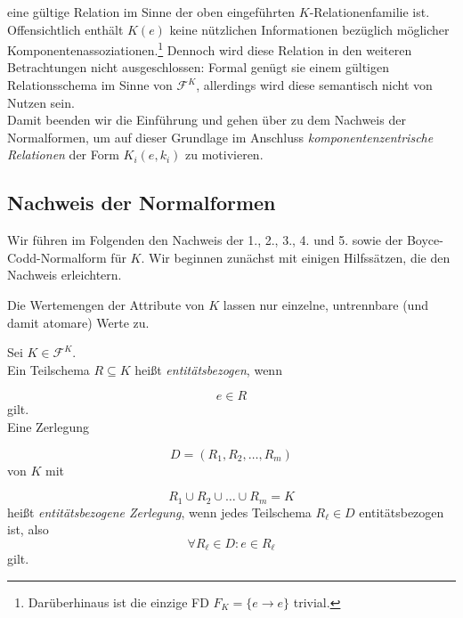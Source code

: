 \noindent
eine gültige Relation im Sinne der oben eingeführten $K$-Relationenfamilie ist.
Offensichtlich enthält $K(e)$ keine nützlichen Informationen bezüglich möglicher Komponentenassoziationen.\footnote{
    Darüberhinaus ist die einzige FD $F_K = \{e \rightarrow e\}$ trivial.
}
Dennoch wird diese Relation in den weiteren Betrachtungen nicht ausgeschlossen:
Formal genügt sie einem gültigen Relationsschema im Sinne von $\mathcal{F}^K$, allerdings wird diese semantisch nicht von Nutzen sein.\\

Damit beenden wir die Einführung und gehen über zu dem Nachweis der Normalformen, um auf dieser Grundlage im Anschluss \textit{komponentenzentrische Relationen} der Form $K_i(e, k_i)$ zu motivieren.

\subsection{Nachweis der Normalformen}

Wir führen im Folgenden den Nachweis der 1., 2., 3., 4. und 5. sowie der Boyce-Codd-Normalform für $K$.
Wir beginnen zunächst mit einigen Hilfssätzen, die den Nachweis erleichtern.

\bigskip
\begin{modelassumption}\label{mass:nur_atomar}
    Die Wertemengen der Attribute von $K$ lassen nur einzelne, untrennbare (und damit atomare) Werte zu.
\end{modelassumption}


\begin{definition}\label{def:entitätsbezogen}

    Sei $K \in \mathcal{F}^K$.\\

    \noindent
    Ein Teilschema $R \subseteq K$ heißt \textit{entitätsbezogen}, wenn

    \[
        e \in R
    \]
    gilt.\\

    \noindent
    Eine Zerlegung

    \[
        D = (R_1, R_2, \ldots, R_m)
    \]
    von $K$ mit

    \[
        R_1 \cup R_2 \cup \ldots \cup R_m = K
    \]
    heißt \textit{entitätsbezogene Zerlegung}, wenn jedes Teilschema $R_\ell \in D$ entitätsbezogen ist, also
    \[
        \forall R_{\ell} \in D: e \in R_{\ell}
    \]
    gilt.
\end{definition}
\bigskip





